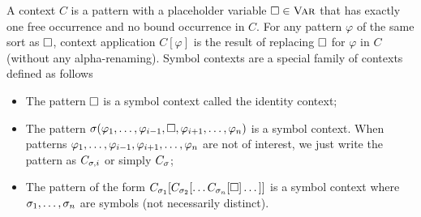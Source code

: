 \documentclass{amsart}
\begin{document}
A context $C$ is a pattern with a placeholder variable
$\square \in \textnormal{\textsc{Var}}$ that has exactly one free occurrence
and no bound occurrence in $C$.
For any pattern $\varphi$ of the same sort as $\square$,
context application $C[\varphi]$ is the result of
replacing $\square$ for $\varphi$ in $C$ (without any alpha-renaming).
Symbol contexts are a special family of contexts defined as follows
\begin{itemize}
\item The pattern $\square$ is a symbol context called the identity context;
\item The pattern
      $\sigma(\varphi_1 ,\dots, \varphi_{i-1}, 
              \square , 
              \varphi_{i+1} ,\dots, \varphi_n)$
      is a symbol context.
      When patterns 
      $\varphi_1 ,\dots, \varphi_{i-1},\\ \varphi_{i+1} ,\dots, \varphi_n$
      are not of interest,
      we just write the pattern as $C_{\sigma,i}$ or simply $C_{\sigma}$;
\item The pattern of the form
      $
      C_{\sigma_1}[C_{\sigma_2}[\dots  C_{\sigma_n}[\square] \dots]]
      $
      is a symbol context
      where $\sigma_1 ,\dots, \sigma_n$ are symbols (not necessarily distinct).
\end{itemize}
\end{document}
